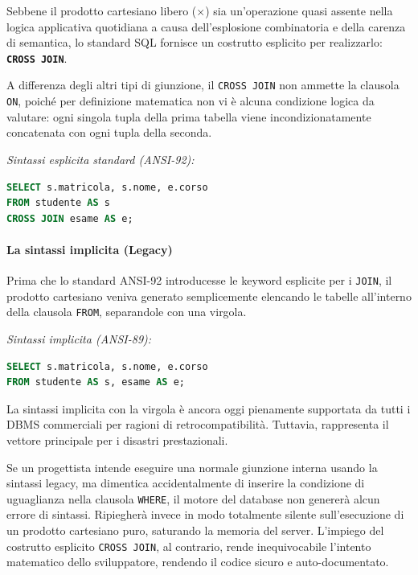 Sebbene il prodotto cartesiano libero ($\times$) sia un'operazione quasi assente nella logica applicativa quotidiana a causa dell'esplosione combinatoria e della carenza di semantica, lo standard SQL fornisce un costrutto esplicito per realizzarlo: \textbf{\texttt{CROSS JOIN}}.

A differenza degli altri tipi di giunzione, il \texttt{CROSS JOIN} non ammette la clausola \texttt{ON}, poiché per definizione matematica non vi è alcuna condizione logica da valutare: ogni singola tupla della prima tabella viene incondizionatamente concatenata con ogni tupla della seconda.

\textit{Sintassi esplicita standard (ANSI-92):}
\begin{lstlisting}[language=SQL, basicstyle=\ttfamily\small, keywordstyle=\color{blue}\bfseries]
SELECT s.matricola, s.nome, e.corso
FROM studente AS s
CROSS JOIN esame AS e;
\end{lstlisting}

\paragraph{La sintassi implicita (Legacy)}

Prima che lo standard ANSI-92 introducesse le keyword esplicite per i \texttt{JOIN}, il prodotto cartesiano veniva generato semplicemente elencando le tabelle all'interno della clausola \texttt{FROM}, separandole con una virgola.

\textit{Sintassi implicita (ANSI-89):}
\begin{lstlisting}[language=SQL, basicstyle=\ttfamily\small, keywordstyle=\color{blue}\bfseries]
SELECT s.matricola, s.nome, e.corso
FROM studente AS s, esame AS e;
\end{lstlisting}

\begin{warningbox}
La sintassi implicita con la virgola è ancora oggi pienamente supportata da tutti i DBMS commerciali per ragioni di retrocompatibilità. Tuttavia, rappresenta il vettore principale per i disastri prestazionali. 

Se un progettista intende eseguire una normale giunzione interna usando la sintassi legacy, ma dimentica accidentalmente di inserire la condizione di uguaglianza nella clausola \texttt{WHERE}, il motore del database non genererà alcun errore di sintassi. Ripiegherà invece in modo totalmente silente sull'esecuzione di un prodotto cartesiano puro, saturando la memoria del server. 
L'impiego del costrutto esplicito \texttt{CROSS JOIN}, al contrario, rende inequivocabile l'intento matematico dello sviluppatore, rendendo il codice sicuro e auto-documentato.
\end{warningbox}

